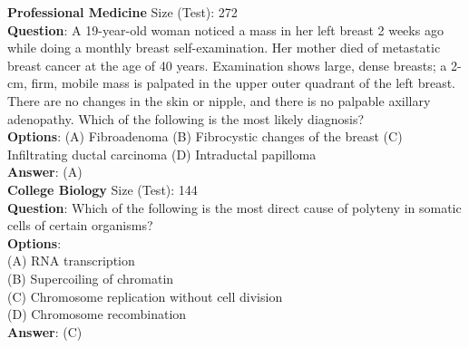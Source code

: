 \documentclass{article}
\begin{document}
\begin{myboxnote}
    \textbf{Professional Medicine} Size (Test): 272 \\
    \textbf{Question}: A 19-year-old woman noticed a mass in her left breast 2 weeks ago while doing a monthly breast self-examination. Her mother died of metastatic breast cancer at the age of 40 years. Examination shows large, dense breasts; a 2-cm, firm, mobile mass is palpated in the upper outer quadrant of the left breast. There are no changes in the skin or nipple, and there is no palpable axillary adenopathy. Which of the following is the most likely diagnosis? \\
    \textbf{Options}: (A) Fibroadenoma (B) Fibrocystic changes of the breast (C) Infiltrating ductal carcinoma (D) Intraductal papilloma \\
    \textbf{Answer}: (A) \\
    
    \textbf{College Biology} Size (Test): 144 \\
    \textbf{Question}: Which of the following is the most direct cause of polyteny in somatic cells of certain organisms? \\
    \textbf{Options}: \\ (A) RNA transcription \\ (B) Supercoiling of chromatin \\ (C) Chromosome replication without cell division \\ (D) Chromosome recombination \\
    \textbf{Answer}: (C)
\end{myboxnote}
\end{document}
